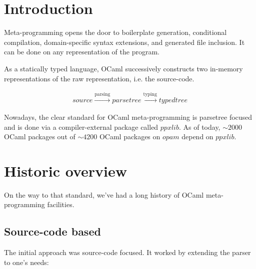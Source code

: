 \documentclass[10pt, a4paper, twocolumn]{article}
\begin{document}

\twocolumn[
  \begin{@twocolumnfalse}
    \maketitle
    \begin{abstract}
      \abstractText
      \newline
      \newline
    \end{abstract}
  \end{@twocolumnfalse}
]


\section{Introduction}
Meta-programming opens the door to boilerplate generation, conditional
compilation, domain-specific syntax extensions, and generated file inclusion. It
can be done on any representation of the program.

As a statically typed language, OCaml successively constructs two in-memory
representations of the raw representation, i.e. the source-code.

\begin{align*}
source \xrightarrow{\text{parsing}} parsetree \xrightarrow{\text{typing}} typedtree
\end{align*}

Nowadays, the clear standard for OCaml meta-programming is parsetree focused and
is done via a compiler-external package called $ppxlib$. As of today, $\sim2000$
OCaml packages out of $\sim4200$ OCaml packages on $opam$ depend on $ppxlib$.

\section{Historic overview}

On the way to that standard, we've had a long history of OCaml meta-programming
facilities.

\subsection{Source-code based}

The initial approach was source-code focused. It worked by extending the parser
to one's needs:
\end{document}
